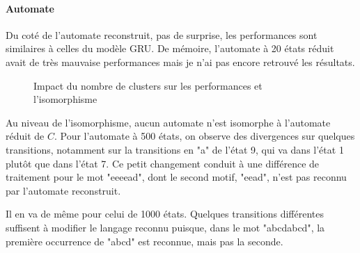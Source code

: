 \documentclass{article}
\begin{document}
\paragraph{Automate} Du coté de l'automate reconstruit, pas de surprise, les performances sont similaires à celles du modèle GRU.
De mémoire, l'automate à 20 états réduit avait de très mauvaise performances mais je n'ai pas encore retrouvé les résultats.

\begin{figure}[ht]
    \centering
    \caption{Impact du nombre de clusters sur les performances et l'isomorphisme}
    \label{tab:clusters-advanced}
\end{figure}

Au niveau de l'isomorphisme, aucun automate n'est isomorphe à l'automate réduit de $C$. Pour l'automate à 500 états, on observe des divergences sur quelques
transitions, notamment sur la transitions en "a" de l'état 9, qui va dans l'état 1 plutôt que dans l'état 7. Ce petit changement conduit à une différence 
de traitement pour le mot "eeeead", dont le second motif, "eead", n'est pas reconnu par l'automate reconstruit. 
\par Il en va de même pour celui de 1000 états.
Quelques transitions différentes suffisent à modifier le langage reconnu puisque, dans le mot "abcdabcd", la première occurrence de "abcd" est reconnue, 
mais pas la seconde.
\end{document}
